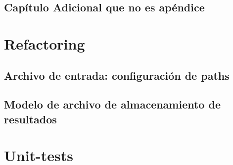 \begin{additional} 
\section{Capítulo Adicional que no es apéndice}
\end{additional}

\begin{appendix} 
\section{Refactoring}
\subsection{Archivo de entrada: configuraci\'on de paths}
\label{subs:a1}
\subsection{Modelo de archivo de almacenamiento de resultados}
\section{Unit-tests}
\end{appendix}

